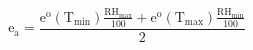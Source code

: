 \documentclass[12pt]{article}
\begin{document}
\begin{displaymath}
\mathrm{e}_{\mathrm{a}}=\frac{\mathrm{e}^{\mathrm{o}}\left(\mathrm{T}_{\min }\right) \frac{\mathrm{RH}_{\max }}{100}+\mathrm{e}^{\mathrm{o}}\left(\mathrm{T}_{\max }\right) \frac{\mathrm{RH}_{\min }}{100}}{2}
\end{displaymath}
\end{document}
